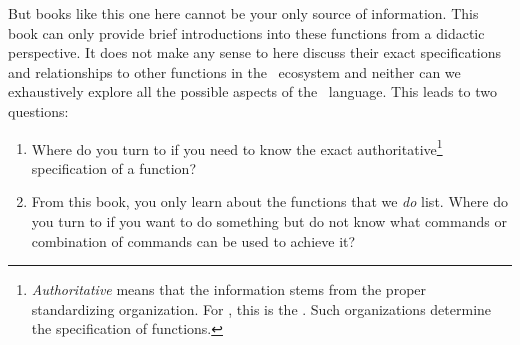 But books like this one here cannot be your only source of information.
This book can only provide brief introductions into these functions from a didactic perspective.
It does not make any sense to here discuss their exact specifications and relationships to other functions in the \python\ ecosystem and neither can we exhaustively explore all the possible aspects of the \python\ language.
This leads to two questions:%
%
\begin{enumerate}%
%
\item Where do you turn to if you need to know the exact authoritative\footnote{%
\emph{Authoritative} means that the information stems from the proper standardizing organization. %
For \python, this is the . %
Such organizations determine the specification of functions.%
} specification of a function?%
%
\item From this book, you only learn about the functions that we \emph{do} list.
Where do you turn to if you want to do something but do not know what commands or combination of commands can be used to achieve it?%
%
\end{enumerate}%
%
%
\label{sec:authorativeDoc}%
%
